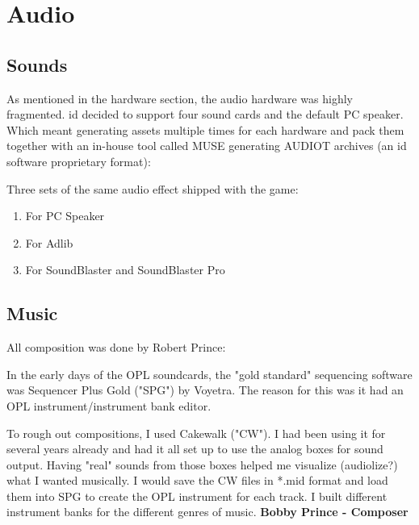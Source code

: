 \documentclass[book.tex]{subfiles}
\begin{document}
\section{Audio}

\subsection{Sounds}
As mentioned in the hardware section, the audio hardware was highly fragmented. id decided to support four sound cards and the default PC speaker. Which meant generating assets multiple times for each hardware and pack them together with an in-house tool called MUSE generating AUDIOT archives (an id software proprietary format):\\
\begin{figure}[H]
\centering
 \end{figure}
 \par
 Three sets of the same audio effect shipped with the game:
\begin{enumerate}
\item For PC Speaker
\item For Adlib
\item For SoundBlaster and SoundBlaster Pro
\end{enumerate}

\par
{}


\subsection{Music}
All composition was done by Robert Prince:\\
\par
 \begin{fancyquotes}
In the early days of the OPL soundcards, the "gold standard" sequencing software was Sequencer Plus Gold ("SPG") by Voyetra. The reason for this was it had an OPL instrument/instrument bank editor.\\
\par
To rough out compositions, I used Cakewalk ("CW"). I had been using it for several years already and had it all set up to use the analog boxes for sound output. Having "real" sounds from those boxes helped me visualize (audiolize?) what I wanted musically. I would save the CW files in *.mid format and load them into SPG to create the OPL instrument for each track. I built different instrument banks for the different genres of music.
\bigskip
\textbf{Bobby Prince - Composer}
 \end{fancyquotes}\\
\end{document}
